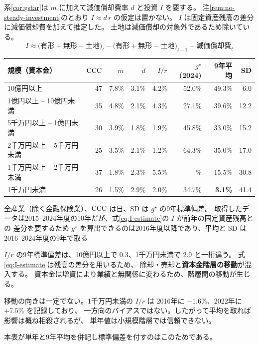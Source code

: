 系\ref{cor:gstar}は $m$ に加えて減価償却費率 $d$ と投資 $I$ を要する。
注\ref{rem:no-steady-investment}のとおり $I\approx d\,r$ の仮定は置かない。
$I$ は固定資産残高の差分に減価償却費を加えて推定した。
土地は減価償却の対象外であるため除いている。
\begin{equation}
I \approx \bigl(\text{有形}+\text{無形}-\text{土地}\bigr)_t
 - \bigl(\text{有形}+\text{無形}-\text{土地}\bigr)_{t-1} + \text{減価償却費}_t
\label{eq:I-estimate}
\end{equation}

\begin{center}
\begin{tabular}{@{}lrrrrrrr@{}}
\toprule
規模（資本金） & $\mathrm{CCC}$ & $m$ & $d$ & $I/r$ & $g^\star$(2024) & 9年平均 & SD \\
\midrule
10億円以上 & 47 & 7.8\% & 3.1\% & 4.2\% & 52.0\% & 49.3\% & 6.0 \\
1億円以上 -- 10億円未満 & 35 & 4.8\% & 2.1\% & 4.3\% & 27.1\% & 39.6\% & 12.2 \\
5千万円以上 -- 1億円未満 & 30 & 3.9\% & 1.8\% & 1.9\% & 45.8\% & 33.0\% & 15.2 \\
2千万円以上 -- 5千万円未満 & 25 & 3.5\% & 2.1\% & 1.2\% & 64.3\% & 35.0\% & 17.0 \\
1千万円以上 -- 2千万円未満 & 37 & 1.8\% & 2.3\% & 5.5\% & \textminus 13.8\% & 15.5\% & 30.8 \\
1千万円未満 & 26 & 1.5\% & 2.9\% & 2.0\% & 34.7\% & \textbf{3.1\%} & 41.4 \\
\bottomrule
\end{tabular}
\label{tab:gstar-by-size}
\end{center}
\begin{center}\footnotesize 全産業（除く金融保険業）、$\mathrm{CCC}$ は日、SD は $g^\star$ の9年標準偏差。
取得したデータは2015--2024年度の10年だが、式\eqref{eq:I-estimate}の $I$ が前年の固定資産残高との
差分を要するため $g^\star$ を算出できるのは2016年度以降であり、平均と SD は2016--2024年度の9年で取る\end{center}

\begin{remark}[単年値は規模により信頼性が異なる]
\label{rem:gstar-reliability}
$I/r$ の9年標準偏差は、10億円以上で 0.3、1千万円未満で 2.9 と一桁違う。
式\eqref{eq:I-estimate}は残高の差分を用いるため、
除却・売却と\textbf{資本金階層の移動}が混入する。
資本金は増資により業績と無関係に変わるため、階層間の移動が生じる。

移動の向きは一定でない。1千万円未満の $I/r$ は
2016年に $-1.6\%$、2022年に $+7.5\%$ を記録しており、
一方向のバイアスではない。したがって平均を取れば影響は概ね相殺されるが、
単年値は小規模階層では信頼できない。

本表が単年と9年平均を併記し標準偏差を付すのはこのためである。
\end{remark}

